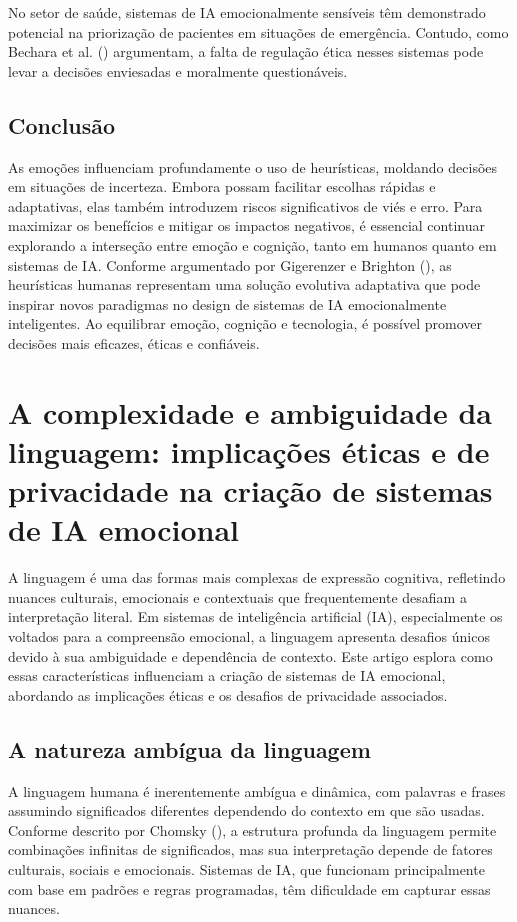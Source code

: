 \documentclass[a4paper,12pt]{report}
\begin{document}
	No setor de saúde, sistemas de IA emocionalmente sensíveis têm demonstrado potencial na priorização de pacientes em situações de emergência. Contudo, como Bechara et al. (\citeyear{bechara2000}) argumentam, a falta de regulação ética nesses sistemas pode levar a decisões enviesadas e moralmente questionáveis.
	
	\subsection{Conclusão}
	
	As emoções influenciam profundamente o uso de heurísticas, moldando decisões em situações de incerteza. Embora possam facilitar escolhas rápidas e adaptativas, elas também introduzem riscos significativos de viés e erro. Para maximizar os benefícios e mitigar os impactos negativos, é essencial continuar explorando a interseção entre emoção e cognição, tanto em humanos quanto em sistemas de IA. Conforme argumentado por Gigerenzer e Brighton (\citeyear{gigerenzer2009}), as heurísticas humanas representam uma solução evolutiva adaptativa que pode inspirar novos paradigmas no design de sistemas de IA emocionalmente inteligentes. Ao equilibrar emoção, cognição e tecnologia, é possível promover decisões mais eficazes, éticas e confiáveis.
	
	
	\section{A complexidade e ambiguidade da linguagem: implicações éticas e de privacidade na criação de sistemas de IA emocional}
	
	A linguagem é uma das formas mais complexas de expressão cognitiva, refletindo nuances culturais, emocionais e contextuais que frequentemente desafiam a interpretação literal. Em sistemas de inteligência artificial (IA), especialmente os voltados para a compreensão emocional, a linguagem apresenta desafios únicos devido à sua ambiguidade e dependência de contexto. Este artigo esplora como essas características influenciam a criação de sistemas de IA emocional, abordando as implicações éticas e os desafios de privacidade associados.
	
	\subsection{A natureza ambígua da linguagem}
	
	A linguagem humana é inerentemente ambígua e dinâmica, com palavras e frases assumindo significados diferentes dependendo do contexto em que são usadas. Conforme descrito por Chomsky (\citeyear{chomsky1965}), a estrutura profunda da linguagem permite combinações infinitas de significados, mas sua interpretação depende de fatores culturais, sociais e emocionais. Sistemas de IA, que funcionam principalmente com base em padrões e regras programadas, têm dificuldade em capturar essas nuances.
	
\end{document}
